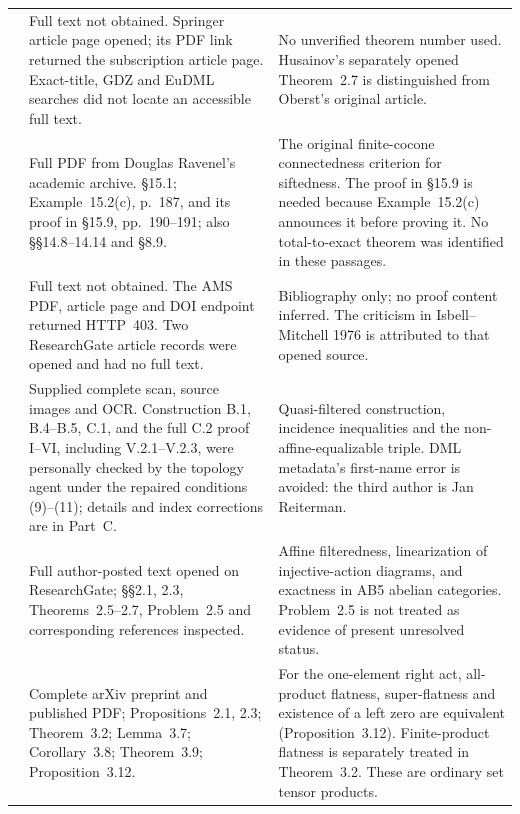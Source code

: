 \begin{longtable}{@{}p{}p{}p{}@{}}
\citet{Oberst1968}
& Full text not obtained. Springer article page opened; its PDF link
returned the subscription article page. Exact-title, GDZ and EuDML
searches did not locate an accessible full text.
& No unverified theorem number used. Husainov's separately opened
Theorem~2.7 is distinguished from Oberst's original article. \\

\citet{GabrielUlmer1971}
& Full PDF from Douglas Ravenel's academic archive. \S15.1;
Example~15.2(c), p.~187, and its proof in \S15.9, pp.~190--191;
also \S\S14.8--14.14 and \S8.9.
& The original finite-cocone connectedness criterion for siftedness.
The proof in \S15.9 is needed because Example~15.2(c) announces it
before proving it. No total-to-exact theorem was identified in these
passages. \\

\citet{AdamekReiterman1975}
& Full text not obtained. The AMS PDF, article page and DOI endpoint
returned HTTP~403. Two ResearchGate article records were opened and
had no full text.
& Bibliography only; no proof content inferred. The criticism in
Isbell--Mitchell 1976 is attributed to that opened source. \\

\citet{AdamekKoubekReiterman1981}
& Supplied complete scan, source images and OCR. Construction B.1,
B.4--B.5, C.1, and the full C.2 proof I--VI, including V.2.1--V.2.3,
were personally checked by the topology agent under the repaired
conditions (9)--(11); details and index corrections are in Part~C.
& Quasi-filtered construction, incidence inequalities and the
non-affine-equalizable triple. DML metadata's first-name error is
avoided: the third author is Jan Reiterman. \\

\citet{Husainov2002}
& Full author-posted text opened on ResearchGate; \S\S2.1, 2.3,
Theorems~2.5--2.7, Problem~2.5 and corresponding references inspected.
& Affine filteredness, linearization of injective-action diagrams,
and exactness in AB5 abelian categories. Problem~2.5 is not treated
as evidence of present unresolved status. \\

\citet{SedaghatjooKhaksari2017}
& Complete arXiv preprint and published PDF; Propositions~2.1, 2.3;
Theorem~3.2; Lemma~3.7; Corollary~3.8; Theorem~3.9;
Proposition~3.12.
& For the one-element right act, all-product flatness, super-flatness
and existence of a left zero are equivalent (Proposition~3.12).
Finite-product flatness is separately treated in Theorem~3.2.
These are ordinary set tensor products. \\


\end{longtable}
